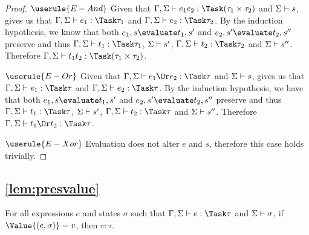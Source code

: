 \begin{proof}
  \case
    {$\userule{E-And}$}
    {Given that $\Gamma,\Sigma\infers e_1\And e_2:\Task(\tau_1\times\tau_2)$ and $\Sigma\vdash s$,  gives us that $\Gamma,\Sigma\infers e_1:\Task\tau_1$ and $\Gamma,\Sigma\infers e_2:\Task\tau_2$.
    By the induction hypothesis, we know that both $e_1,s\evaluate t_1,s'$ and $e_2,s'\evaluate t_2,s''$ preserve and thus $\Gamma,\Sigma\infers t_1:\Task\tau_1$, $\Sigma\vdash s'$, $\Gamma,\Sigma\infers t_2:\Task\tau_2$ and $\Sigma\vdash s''$.
    Therefore $\Gamma,\Sigma\infers t_1\And t_2:\Task(\tau_1\times\tau_2)$.}

  \case
    {$\userule{E-Or}$}
    {Given that $\Gamma,\Sigma\infers e_1\Or e_2:\Task\tau$ and $\Sigma\vdash s$,  gives us that $\Gamma,\Sigma\infers e_1:\Task\tau$ and $\Gamma,\Sigma\infers e_2:\Task\tau$.
    By the induction hypothesis, we have that both $e_1,s\evaluate t_1,s'$ and $e_2,s'\evaluate t_2,s''$ preserve and thus $\Gamma,\Sigma\infers t_1:\Task\tau$, $\Sigma\vdash s'$, $\Gamma,\Sigma\infers t_2:\Task\tau$ and $\Sigma\vdash s''$.
    Therefore $\Gamma,\Sigma\infers t_1\Or t_2:\Task\tau$.}

  \case
    {$\userule{E-Xor}$}
    {Evaluation does not alter $e$ and $s$, therefore this case holds trivially.}

\end{proof}



\subsection{\cref{lem:presvalue}}

\begin{lemma}
  For all expressions $e$ and states $\sigma$
  such that $\Gamma,\Sigma \infers e:\Task\tau$ and $\Sigma \vdash \sigma$,
  if $\Value{(e,\sigma)}=v$,
  then $v:\tau$.
  \label{lem:presvalue}
\end{lemma}


